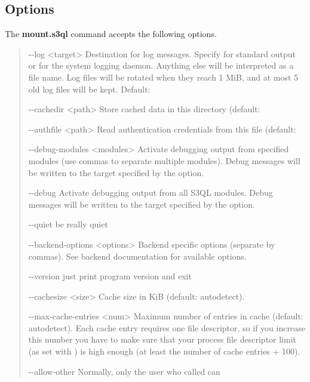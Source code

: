\documentclass[letterpaper,10pt,english]{sphinxmanual}
\begin{document}
\subsection{Options}
\label{man/mount:options}
The \textbf{mount.s3ql} command accepts the following options.
\begin{quote}
\begin{optionlist}{3cm}
\item [-{-}log \textless{}target\textgreater{}]  
Destination for log messages. Specify  for
standard output or  for the system logging
daemon. Anything else will be interpreted as a file
name. Log files will be rotated when they reach 1 MiB,
and at most 5 old log files will be kept. Default:
\item [-{-}cachedir \textless{}path\textgreater{}]  
Store cached data in this directory (default:
\item [-{-}authfile \textless{}path\textgreater{}]  
Read authentication credentials from this file
(default: 
\item [-{-}debug-modules \textless{}modules\textgreater{}]  
Activate debugging output from specified modules (use
commas to separate multiple modules). Debug messages
will be written to the target specified by the
 option.
\item [-{-}debug]  
Activate debugging output from all S3QL modules. Debug
messages will be written to the target specified by
the  option.
\item [-{-}quiet]  
be really quiet
\item [-{-}backend-options \textless{}options\textgreater{}]  
Backend specific options (separate by commas). See
backend documentation for available options.
\item [-{-}version]  
just print program version and exit
\item [-{-}cachesize \textless{}size\textgreater{}]  
Cache size in KiB (default: autodetect).
\item [-{-}max-cache-entries \textless{}num\textgreater{}]  
Maximum number of entries in cache (default:
autodetect). Each cache entry requires one file
descriptor, so if you increase this number you have to
make sure that your process file descriptor limit (as
set with ) is high enough (at least the
number of cache entries + 100).
\item [-{-}allow-other]  
Normally, only the user who called  can

\end{optionlist}
\end{quote}
\end{document}
